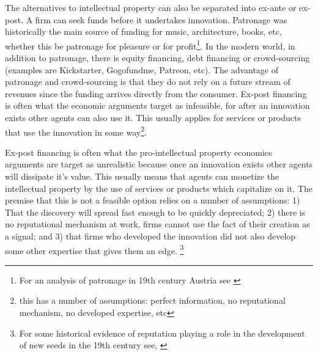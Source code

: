 The alternatives to intellectual property can also be separated into ex-ante or ex-post. A firm can seek funds before it undertakes innovation. Patronage was historically the main source of funding for music, architecture, books, etc, whether this be patronage for pleasure or for profit\footnote{For an analysis of patronage in 19th century Austria see \cite{carletti2013top} }. In the modern world, in addition to patronage, there is equity financing, debt financing or crowd-sourcing (examples are Kickstarter, Gogofundme, Patreon, etc). The advantage of patronage and crowd-sourcing is that they do not rely on a future stream of revenues since the funding arrives directly from the consumer. Ex-post financing is often what the economic arguments target as infeasible, for after an innovation exists other agents can also use it. This usually applies for services or products that use the innovation in some way\footnote{ this has a number of assumptions: perfect information, no reputational mechanism, no developed expertise, etc }.


Ex-post financing is often what the pro-intellectual property economics arguments are target as unrealistic because once an innovation exists other agents will dissipate it's value. This usually means that agents can monetize the intellectual property by the use of services or products which capitalize on it. The premise that this is not a feasible option relies on a number of assumptions: 1) That the discovery will spread fast enough to be quickly depreciated; 2) there is no reputational mechanism at work, firms cannot use the fact of their creation as a signal; and 3) that firms who developed the innovation did not also develop some other expertise that gives them an edge. \footnote{For some historical evidence of reputation playing a role in the development of new seeds in the 19th century see, \cite{charnley2013seeds}}






